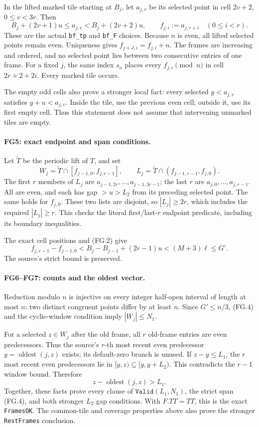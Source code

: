 \documentclass[11pt,a4paper]{article}
\numberwithin{equation}{section}
\theoremstyle{remark}\newtheorem{remark}[theorem]{Remark}
\begin{document}
In the lifted marked tile starting at $B_j$, let $a_{j,v}$ be its
selected point in cell $2v+2$, $0\le v<3r$. Then
\[
 B_j+(2v+1)u\le a_{j,v}<B_j+(2v+2)u,\qquad
 f_{j,i}:=a_{j,r+i}\quad(0\le i<r).                    \tag{FG.3}
\]
These are the actual \texttt{bf\_tp} and \texttt{bf\_F} choices.
Because $n$ is even, all lifted selected points remain even.
Uniqueness gives $f_{j+J,i}=f_{j,i}+n$.
The frames are increasing and ordered, and no selected point lies
between two consecutive entries of one frame. For a fixed $j$,
the same index $s_a$ places every $f_{j,i}\pmod n$ in cell
$2r+2+2i$. Every marked tile occurs.

The empty odd cells also prove a stronger local fact: every selected
$y<a_{j,v}$ satisfies $y+u<a_{j,v}$. Inside the tile, use the previous
even cell; outside it, use its first empty cell. Thus this statement
does not assume that intervening unmarked tiles are empty.

\paragraph{FG5: exact endpoint and span conditions.}
Let $\widetilde T$ be the periodic lift of $T$, and set
\[
 W_j=\widetilde T\cap[f_{j-1,0},f_{j,r-1}],\qquad
 L_j=\widetilde T\cap(f_{j-1,r-1},f_{j,0}).
\]
The first $r$ members of $L_j$ are $a_{j-1,2r},\ldots,a_{j-1,3r-1}$;
the last $r$ are $a_{j,0},\ldots,a_{j,r-1}$.
All are even, and each has gap $>u>L_2$ from its preceding selected
point. The same holds for $f_{j,0}$. These two lists are disjoint,
so $|L_j|\ge2r$, which includes the required $|L_j|\ge r$.
This checks the literal first/last-$r$ endpoint predicate, including
its boundary inequalities.

The exact cell positions and (FG.2) give
\[
 f_{j,r-1}-f_{j-1,0}
 <B_j-B_{j-1}+(2r-1)u
 <(M+3)\ell\le G'.                                    \tag{FG.4}
\]
The source's strict bound is preserved.

\paragraph{FG6--FG7: counts and the oldest vector.}
Reduction modulo $n$ is injective on every integer half-open interval
of length at most $n$: two distinct congruent points differ by at
least $n$. Since $G'\le n/3$, (FG.4) and the cyclic-window condition imply
$|W_j|\le N_1$.

For a selected $z\in W_j$ after the old frame, all $r$ old-frame
entries are even predecessors. Thus the source's $r$-th most recent
even predecessor $y=\operatorname{oldest}(j,z)$ exists; its
default-zero branch is unused. If $z-y\le L_1$, the $r$ most recent
even predecessors lie in $[y,z)\subseteq[y,y+L_2)$.
This contradicts the $r-1$ window bound. Therefore
\[
 z-\operatorname{oldest}(j,z)>L_1.                    \tag{FG.5}
\]
Together, these facts prove every clause of
$\texttt{Valid}(L_1,N_1)$, the strict span (FG.4), and both stronger
$L_2$ gap conditions. With $F.TT=TT$, this is the exact
\texttt{FramesOK}. The common-tile and coverage properties above also
prove the stronger \texttt{RestFrames} conclusion.
\end{document}
